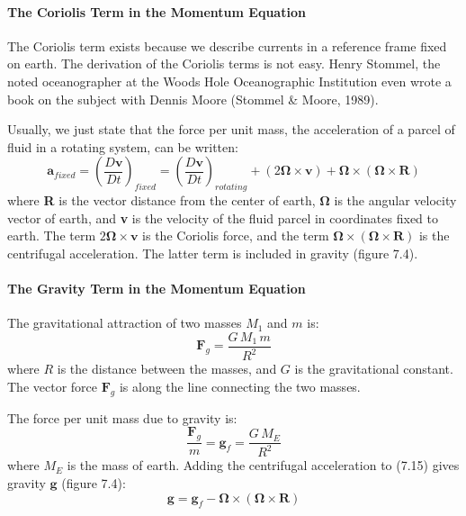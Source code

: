 \paragraph{The Coriolis Term in the Momentum Equation}
The Coriolis term exists because we describe currents in a reference frame fixed on earth. The derivation of the Coriolis terms is not easy. Henry Stommel, the noted oceanographer at the Woods Hole Oceanographic Institution even wrote a book on the subject with Dennis Moore (Stommel \& Moore, 1989).

Usually, we just state that the force per unit mass, the acceleration of a parcel of fluid in a rotating system, can be written:
\begin{equation}
\textbf{a}_{fixed} = \left(\frac{D\textbf{v}}{Dt}\right)_{fixed} =
 \left(\frac{D\textbf{v}}{Dt}\right)_{rotating} + \left( 2 \boldsymbol{\Omega}
\times \mathbf{v} \right) + \boldsymbol{\Omega} \times \left(
\boldsymbol{\Omega} \times \mathbf{R} \right)
\end{equation}
where \textbf{R} is the vector distance from the center of earth,
$\boldsymbol{\Omega}$ is the angular velocity vector of earth,
and \textbf{v} is the velocity of the fluid parcel in coordinates fixed to earth.
The term $2 \boldsymbol{\Omega} \times \mathbf{v}$ is the Coriolis force, and the
term $\boldsymbol{\Omega} \times \left( \boldsymbol{\Omega} \times \mathbf{R}
\right)$ is the centrifugal acceleration. The latter term is included in gravity
(figure 7.4).

\paragraph{The Gravity Term in the Momentum Equation}
The gravitational attraction
of two masses $M_1$ and $m$ is:
\begin{displaymath}
\textbf{F}_g = \frac{G\,M_1\, m}{R^2}
\end{displaymath}
where $R$ is the distance between the masses, and $G$ is the gravitational
constant. The vector force $\textbf{F}_g$ is along the line connecting the two
masses.

The force per unit mass due to gravity is:
\begin{equation}
\frac{\textbf{F}_g}{m} = \textbf{g}_f =\frac{G\,M_E}{R^2}
\end{equation}
where $M_E$ is the mass of earth. Adding the centrifugal acceleration to (7.15)
gives gravity $\textbf{g}$ (figure 7.4):
\begin{equation}
\textbf{g} = \textbf{g}_f - \boldsymbol{\Omega} \times
\left( \boldsymbol{\Omega} \times \mathbf{R}
\right)
\end{equation}


